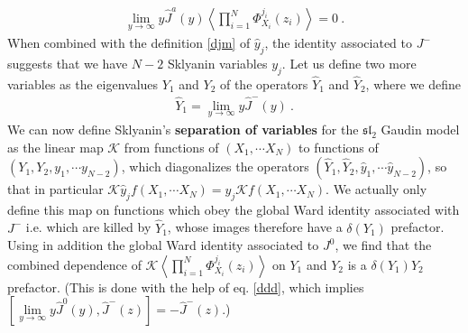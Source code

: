 \documentclass[12pt, a4paper, notitlepage, twoside]{report}
\numberwithin{equation}{section}
\theoremstyle{break}
\begin{document}
\begin{align}
 \underset{y\to \infty}{\lim} y \hat{J}^a(y) \left\langle \prod_{i=1}^N \Phi^{j_i}_{X_i}(z_i)\right\rangle = 0\ .
\end{align}
When combined with the definition \eqref{djm} of $\hat{y}_j$, the identity associated to $J^-$ suggests that we have $N-2$ Sklyanin variables $y_j$.
Let us define two more variables as the eigenvalues $Y_1$ and $Y_2$ of the operators $\hat{Y}_1$ and $\hat{Y}_2$, where we define
\begin{align}
 \hat{Y}_1 = \underset{y\to \infty}{\lim} y \hat{J}^-(y)\ .
\end{align}
We can now define Sklyanin's \textbf{\boldmath separation of variables} for the $\mathfrak{sl}_2$ Gaudin model as the linear 
map $\mathcal{K}$ from functions of $(X_1,\cdots X_N)$ to functions of $(Y_1,Y_2,y_1,\cdots y_{N-2})$, which diagonalizes the operators $(\hat{Y}_1,\hat{Y}_2,\hat{y}_1,\cdots \hat{y}_{N-2})$, so that in particular $\mathcal{K} \hat{y}_j f(X_1,\cdots X_N) = y_j \mathcal{K} f(X_1,\cdots X_N)$.
We actually only define this map on 
functions which obey the global Ward identity associated with $J^-$ i.e.
which are killed by $\hat{Y}_1$, whose images therefore have a $\delta(Y_1)$ prefactor.
Using in addition the global Ward identity associated to $J^0$, we find that the combined dependence of $\mathcal{K}\left\langle \prod_{i=1}^N \Phi^{j_i}_{X_i}(z_i)\right\rangle$ on $Y_1$ and $Y_2$ is a $\delta(Y_1)Y_2$ prefactor.
(This is done with the help of eq. \eqref{ddd}, which implies $[\underset{y\to \infty}{\lim} y \hat{J}^0(y),\hat{J}^-(z)]=-\hat{J}^-(z)$.)
\end{document}
